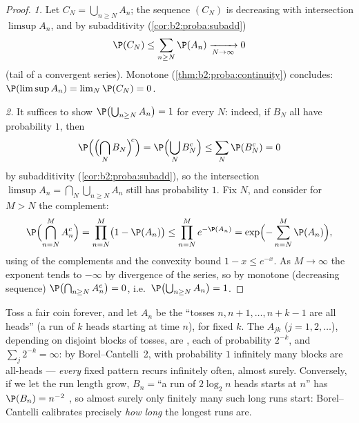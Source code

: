 \begin{proof}
\emph{1.} Let $C_N = \bigcup_{n \geq N}A_n$; the sequence $(C_N)$
is decreasing with intersection $\limsup A_n$, and by 
subadditivity (\cref{cor:b2:proba:subadd})
\[
\P(C_N) \leq \sum_{n \geq N}\P(A_n)
\xrightarrow[N\to\infty]{} 0
\]
(tail of a convergent series). Monotone 
(\cref{thm:b2:proba:continuity}) concludes: $\P(\limsup A_n) =
\lim_N \P(C_N) = 0$.

\emph{2.} It suffices to show $\P\bigl(\bigcup_{n\geq N}A_n\bigr)
= 1$ for every $N$: indeed, if  $B_N$ all have
probability $1$, then
\[
\P\Bigl(\Bigl(\bigcap_NB_N\Bigr)^{\!c}\Bigr)
= \P\Bigl(\bigcup_NB_N^c\Bigr)
\leq \sum_N\P(B_N^c) = 0
\]
by  subadditivity
(\cref{cor:b2:proba:subadd}), so the  intersection
$\limsup A_n = \bigcap_N\bigcup_{n\geq N}A_n$ still has
probability $1$. Fix $N$, and consider for $M > N$ the
complement:
\[
\P\Bigl(\bigcap_{n=N}^{M} A_n^c\Bigr)
= \prod_{n=N}^{M}\bigl(1 - \P(A_n)\bigr)
\leq \prod_{n=N}^{M} e^{-\P(A_n)}
= \exp\Bigl(-\sum_{n=N}^M \P(A_n)\Bigr) ,
\]
using  of the complements and the convexity bound $1 -
x \leq e^{-x}$. As $M \to \infty$ the exponent tends to $-\infty$
by divergence of the series, so by monotone 
(decreasing sequence) $\P\bigl(\bigcap_{n \geq N}A_n^c\bigr) = 0$,
i.e.\ $\P\bigl(\bigcup_{n \geq N}A_n\bigr) = 1$.
\end{proof}

\begin{example}\label{ex:b2:proba:runs}
Toss a fair coin forever, and let $A_n$ be the  ``tosses $n,
n+1, \dots, n + k - 1$ are all heads'' (a run of $k$ heads
starting at time $n$), for fixed $k$. The  $A_{jk}$ ($j =
1, 2, \dots$), depending on disjoint blocks of tosses, are
, each of probability $2^{-k}$, and $\sum_j 2^{-k} =
\infty$: by Borel--Cantelli~2, with probability $1$ infinitely
many blocks are all-heads --- \emph{every} fixed pattern recurs
infinitely often, almost surely. Conversely, if we let the run
length grow, $B_n = {}$``a run of $2\log_2 n$ heads starts at
$n$'' has $\P(B_n) = n^{-2}$ , so almost surely only
finitely many such long runs start: Borel--Cantelli calibrates
precisely \emph{how long} the longest runs are.
\end{example}

